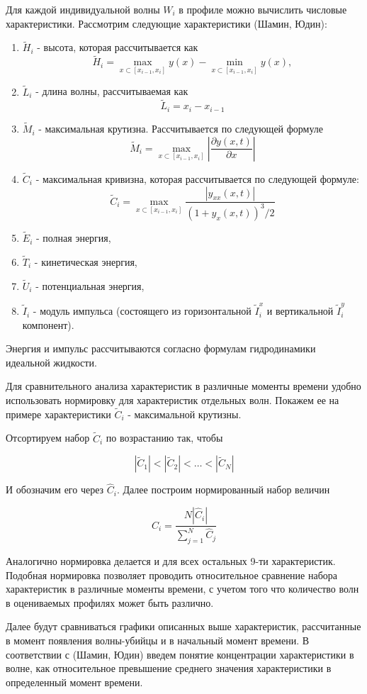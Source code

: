 Для каждой индивидуальной волны $W_i$ в профиле можно вычислить числовые характеристики.
Рассмотрим следующие характеристики (Шамин, Юдин):
\begin{enumerate}
  \item $\tilde{H}_i$ - высота, которая рассчитывается как
  $$
  \tilde{H}_i=\max_{x\subset[x_{i-1},x_i]}y(x)-\min_{x\subset[x_{i-1},x_i]}y(x),
  $$
  \item $\tilde{L}_i$ - длина волны, рассчитываемая как
  $$
  \tilde{L}_i=x_i-x_{i-1}
  $$
  \item $\tilde{M}_i$ - максимальная крутизна. Рассчитывается по следующей формуле
  $$
  \tilde{M}_i=\max_{x\subset[x_{i-1},x_i]}|\frac{\partial y(x,t)}{\partial x}|
  $$
  \item $\tilde{C}_i$ - максимальная кривизна, которая рассчитывается по следующей формуле:
      $$
  \tilde{C}_i=\max_{x\subset[x_{i-1},x_i]}\frac{|y_{xx}(x,t)|}{(1+y_x(x,t))^3/2}
  $$
  \item $\tilde{E}_i$ - полная энергия,
  \item $\tilde{T}_i$  - кинетическая энергия,
  \item $\tilde{U}_i$ - потенциальная энергия,
  \item $\tilde{I}_i$ - модуль импульса (состоящего из горизонтальной $\tilde{I}_i^{x}$ и вертикальной $\tilde{I}_i^{y}$ компонент).
\end{enumerate}

Энергия и импульс рассчитываются согласно формулам гидродинамики идеальной жидкости.

Для сравнительного анализа характеристик в различные моменты времени удобно использовать нормировку для характеристик отдельных волн. Покажем ее на примере характеристики $\tilde{C}_i$ - максимальной крутизны.

Отсортируем набор $\tilde{C}_i$ по возрастанию так, чтобы

$$
|\tilde{C}_1|<|\tilde{C}_2|<\ldots<|\tilde{C}_N|
$$

И обозначим его через $\hat{C}_i$. Далее построим нормированный набор величин

$$
C_i=\frac{N|\hat{C}_i|}{\sum\limits_{j=1}^{N}\hat{C}_j}
$$

Аналогично нормировка делается и для всех остальных 9-ти характеристик. Подобная нормировка позволяет проводить относительное сравнение набора характеристик в различные моменты времени, с учетом того что количество волн в оцениваемых профилях может быть различно.

Далее будут сравниваться графики описанных выше характеристик, рассчитанные в момент появления волны-убийцы и в начальный момент времени. В соответствии с (Шамин, Юдин) введем понятие концентрации характеристики в волне, как относительное превышение среднего значения характеристики в определенный момент времени.

